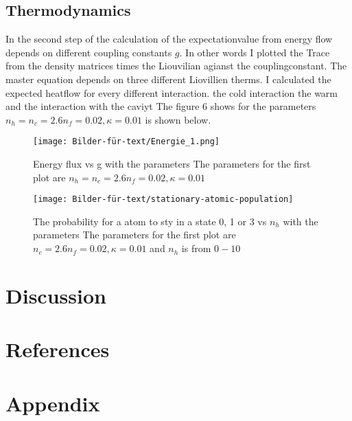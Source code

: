 \documentclass[12pt,a4paper]{article}
\begin{document}
\subsection{Thermodynamics}
In the second step of the calculation of the  expectationvalue from energy flow depends on different coupling constants $g$.
In other words I plotted the Trace from the density matrices times the Liouvilian agianst the couplingconstant.
The master equation depends on three different Liovillien therms. I calculated the expected heatflow for every different interaction. the cold interaction the warm and the interaction with the caviyt
The figure 6 shows  for the parameters $n_h=n_c=2.6 n_f=0.02,\kappa=0.01 $ is shown below.

\begin{figure}[hbtp]
\centering
\texttt{[image: Bilder-für-text/Energie\_1.png]}
\caption{Energy flux vs g with the parameters The parameters for the first plot are $n_h=n_c=2.6 n_f=0.02,\kappa=0.01 $}
\end{figure}


\newpage
\begin{figure}[hbtp]
\centering
\texttt{[image: Bilder-für-text/stationary-atomic-population]}
\caption{The probability for a atom to sty in a state 0, 1 or 3 vs $n_h$ with the parameters The parameters for the first plot are $n_c=2.6 n_f=0.02,\kappa=0.01 $ and $n_h$ is from $0-10$}
\end{figure}

\section{Discussion}


\section{References}




\section{Appendix}
\end{document}
